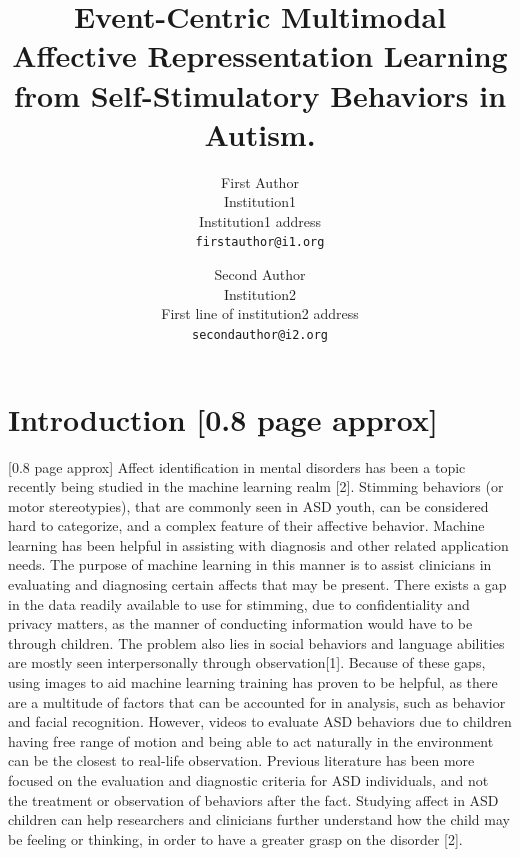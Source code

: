 \documentclass[10pt,twocolumn,letterpaper]{article}
\title{Event-Centric Multimodal Affective Repressentation Learning from Self-Stimulatory Behaviors in Autism.}
\author{First Author\\
Institution1\\
Institution1 address\\
{\tt\small firstauthor@i1.org}
\and
Second Author\\
Institution2\\
First line of institution2 address\\
{\tt\small secondauthor@i2.org}
}
\begin{document}
\maketitle
  


\section{Introduction [0.8 page approx]}
\label{sec:intro}

[0.8 page approx]
Affect identification in mental disorders has been a topic recently being studied in the machine learning realm [2]. Stimming behaviors (or motor stereotypies), that are commonly seen in ASD youth, can be considered hard to categorize, and a complex feature of their affective behavior. Machine learning has been helpful in assisting with diagnosis and other related application needs. The purpose of machine learning in this manner is to assist clinicians in evaluating and diagnosing certain affects that may be present. There exists a gap in the data readily available to use for stimming, due to confidentiality and privacy matters, as the manner of conducting information would have to be through children. The problem also lies in social behaviors and language abilities are mostly seen interpersonally through observation[1]. Because of these gaps, using images to aid machine learning training has proven to be helpful, as there are a multitude of factors that can be accounted for in analysis, such as behavior and facial recognition. However, videos to evaluate ASD behaviors due to children having free range of motion and being able to act naturally in the environment can be the closest to real-life observation. Previous literature has been more focused on the evaluation and diagnostic criteria for ASD individuals, and not the treatment or observation of behaviors after the fact. Studying affect in ASD children can help researchers and clinicians further understand how the child may be feeling or thinking, in order to have a greater grasp on the disorder [2].
\end{document}
